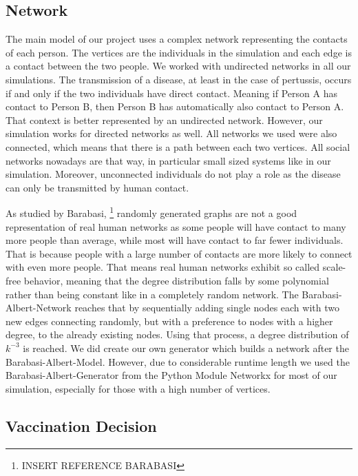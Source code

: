 \documentclass[11pt]{article}
\begin{document}
\subsection{Network}

The main model of our project uses a complex network representing the contacts of each person. The vertices are the individuals in the simulation and each edge is a contact between the two people. We worked with undirected networks in all our simulations. The transmission of a disease, at least in the case of pertussis, occurs if and only if the two individuals have direct contact. Meaning if Person A has contact to Person B, then Person B has automatically also contact to Person A. That context is better represented by an undirected network. However, our simulation works for directed networks as well.
All networks we used were also connected, which means that there is a path between each two vertices. All social networks nowadays are that way, in particular small sized systems like in our simulation. Moreover, unconnected individuals do not play a role as the disease can only be transmitted by human contact.
\vspace{14px}

As studied by Barabasi, \footnote{INSERT REFERENCE BARABASI} randomly generated graphs are not a good representation of real human networks as some people will have contact to many more people than average, while most will have contact to far fewer individuals. That is because people with a large number of contacts are more likely to connect with even more people. That means real human networks exhibit so called scale-free behavior, meaning that the degree distribution falls by some polynomial rather than being constant like in a completely random network. The Barabasi-Albert-Network reaches that by sequentially adding single nodes each with two new edges connecting randomly, but with a preference to nodes with a higher degree, to the already existing nodes. Using that process, a degree distribution of $k^{-3}$ is reached. We did create our own generator which builds a network after the Barabasi-Albert-Model. However, due to considerable runtime length we used the Barabasi-Albert-Generator from the Python Module Networkx for most of our simulation, especially for those with a high number of vertices.
\vspace{14px}


\subsection{Vaccination Decision}
\end{document}
